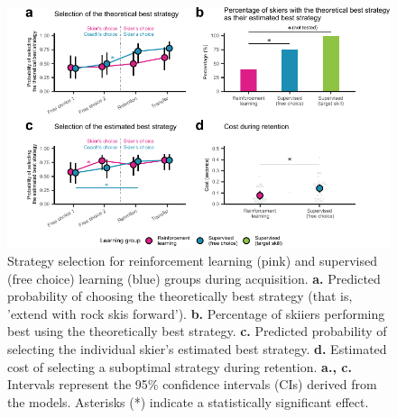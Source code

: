 \documentclass[pdflatex,sn-nature]{sn-jnl}%
\theoremstyle{thmstyleone}%
\theoremstyle{thmstyletwo}%
\theoremstyle{thmstylethree}%
\begin{document}
\begin{figure}[H]
\centering
\includegraphics{figures/figure_choice_estimated_4.pdf}
\caption{Strategy selection for reinforcement learning (pink) and supervised (free choice) learning (blue) groups during acquisition. \textbf{a.} Predicted probability of choosing the theoretically best strategy (that is, 'extend with rock skis forward'). \textbf{b.} Percentage of skiiers performing best using the theoretically best strategy. \textbf{c.} Predicted probability of selecting the individual skier's estimated best strategy. \textbf{d.} Estimated cost of selecting a suboptimal strategy during retention. \textbf{a., c.} Intervals represent the 95\% confidence intervals (CIs) derived from the models. Asterisks (*) indicate a statistically significant effect.}\label{fig: choice_estimated}
\end{figure}
\end{document}
